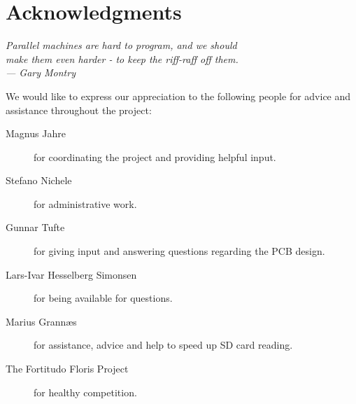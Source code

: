
\bigskip

\begingroup
\let\clearpage\relax
\let\cleardoublepage\relax
\let\cleardoublepage\relax
\chapter*{Acknowledgments}
\begin{flushright}{\slshape
    Parallel machines are hard to program, and we should\\
    make them even harder - to keep the riff-raff off them.\\ \medskip
    ---  Gary Montry}  %
\end{flushright}
\bigskip

We would like to express our appreciation to the following people for
advice and assistance throughout the project:

\begin{description} %
\item[Magnus Jahre] for coordinating the project and providing helpful input.
\item[Stefano Nichele] for administrative work. 
\item[Gunnar Tufte] for giving input and answering questions regarding the PCB
design.
\item[Lars-Ivar Hesselberg Simonsen] for being available for questions.
\item[Marius Grann{\ae}s] for assistance, advice and help to speed up SD
card reading.
\item[The Fortitudo Floris Project] for healthy competition.
\end{description}
\endgroup

